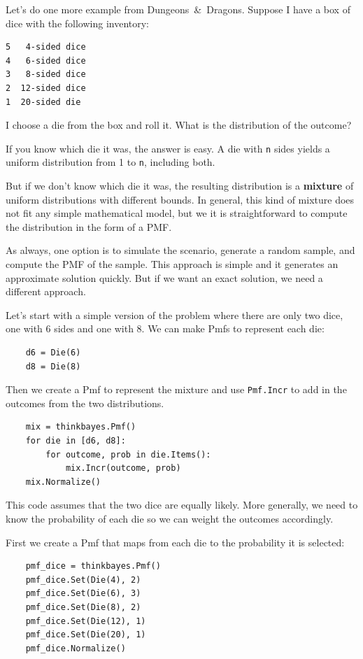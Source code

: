 \documentclass[12pt]{book}
\begin{document}
Let's do one more example from Dungeons~\&~Dragons.  Suppose
I have a box of dice with the following inventory:

\begin{verbatim}
5   4-sided dice
4   6-sided dice
3   8-sided dice
2  12-sided dice
1  20-sided die
\end{verbatim}

I choose a die from the box and roll it.  What is the distribution
of the outcome?

If you know which die it was, the answer is easy.  A die with {\tt n}
sides yields a uniform distribution from 1 to {\tt n}, including both.

But if we don't know which die it was, the resulting distribution is
a {\bf mixture} of uniform distributions with different bounds.
In general, this kind of mixture does not fit any simple mathematical
model, but we it is straightforward to compute the distribution in
the form of a PMF.

As always, one option is to simulate the scenario, generate a random
sample, and compute the PMF of the sample.  This approach is simple
and it generates an approximate solution quickly.  But if we want an
exact solution, we need a different approach.

Let's start with a simple version of the problem where there are
only two dice, one with 6 sides and one with 8.  We can make Pmfs to
represent each die:

\begin{verbatim}
    d6 = Die(6)
    d8 = Die(8)
\end{verbatim}

Then we create a Pmf to represent the mixture and use {\tt Pmf.Incr}
to add in the outcomes from the two distributions.

\begin{verbatim}
    mix = thinkbayes.Pmf()
    for die in [d6, d8]:
        for outcome, prob in die.Items():
            mix.Incr(outcome, prob)
    mix.Normalize()
\end{verbatim}

This code assumes that the two dice are equally likely.  More
generally, we need to know the probability of each die so we can
weight the outcomes accordingly.

First we create a Pmf that maps from each die to the probability it is
selected:

\begin{verbatim}
    pmf_dice = thinkbayes.Pmf()
    pmf_dice.Set(Die(4), 2)
    pmf_dice.Set(Die(6), 3)
    pmf_dice.Set(Die(8), 2)
    pmf_dice.Set(Die(12), 1)
    pmf_dice.Set(Die(20), 1)
    pmf_dice.Normalize()
\end{verbatim}
\end{document}
